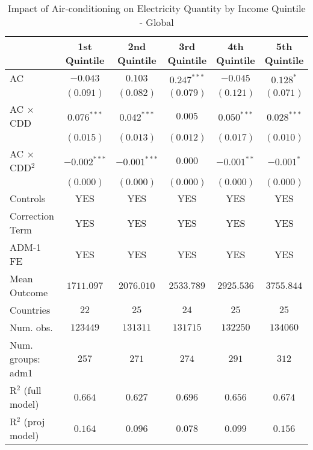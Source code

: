 
\begin{table}[htbp]
\caption{Impact of Air-conditioning on Electricity Quantity by Income Quintile - Global}
\begin{center}
\begin{tabular}{l c c c c c}
\hline
 & 1st Quintile & 2nd Quintile & 3rd Quintile & 4th Quintile & 5th Quintile \\
\hline
AC                      & $-0.043$       & $0.103$        & $0.247^{***}$ & $-0.045$      & $0.128^{*}$   \\
                        & $(0.091)$      & $(0.082)$      & $(0.079)$     & $(0.121)$     & $(0.071)$     \\
AC $\times$ CDD         & $0.076^{***}$  & $0.042^{***}$  & $0.005$       & $0.050^{***}$ & $0.028^{***}$ \\
                        & $(0.015)$      & $(0.013)$      & $(0.012)$     & $(0.017)$     & $(0.010)$     \\
AC $\times$ CDD$^2$     & $-0.002^{***}$ & $-0.001^{***}$ & $0.000$       & $-0.001^{**}$ & $-0.001^{*}$  \\
                        & $(0.000)$      & $(0.000)$      & $(0.000)$     & $(0.000)$     & $(0.000)$     \\
\hline
Controls                & YES            & YES            & YES           & YES           & YES           \\
Correction Term         & YES            & YES            & YES           & YES           & YES           \\
ADM-1 FE                & YES            & YES            & YES           & YES           & YES           \\
Mean Outcome            & $1711.097$     & $2076.010$     & $2533.789$    & $2925.536$    & $3755.844$    \\
Countries               & $22$           & $25$           & $24$          & $25$          & $25$          \\
Num. obs.               & $123449$       & $131311$       & $131715$      & $132250$      & $134060$      \\
Num. groups: adm1       & $257$          & $271$          & $274$         & $291$         & $312$         \\
R$^2$ (full model)      & $0.664$        & $0.627$        & $0.696$       & $0.656$       & $0.674$       \\
R$^2$ (proj model)      & $0.164$        & $0.096$        & $0.078$       & $0.099$       & $0.156$       \\

\end{tabular}
\end{center}
\end{table}
